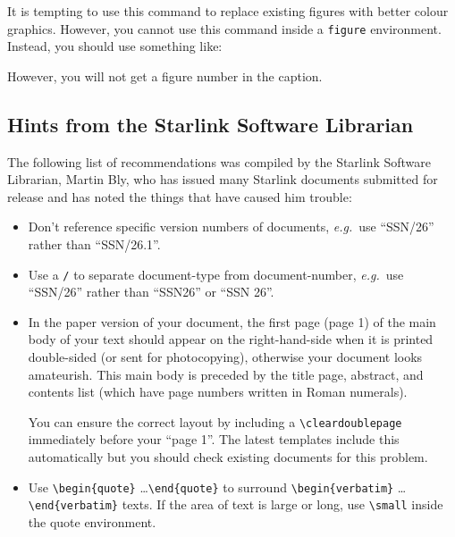\documentclass[twoside,11pt,nolof]{starlink}
\begin{document}
It is tempting to use this command to replace existing figures with better
colour graphics.
However, you cannot use this command inside a \texttt{figure} environment.
Instead, you should use something like:
\begin{quote}
\begin{terminalv}


\end{terminalv}
\end{quote}

However, you will not get a figure number in the caption.

\subsection{Hints from the Starlink Software Librarian}

The following list of recommendations was compiled by the Starlink Software
Librarian, Martin Bly, who has issued many Starlink documents submitted for
release and has noted the things that have caused him trouble:

\begin{itemize}

\item Don't reference specific version numbers of documents, \textit{e.g.}\ use
``SSN/26'' rather than ``SSN/26.1''.

\item Use a \verb+/+ to separate document-type from
document-number, \textit{e.g.}\ use ``SSN/26'' rather than ``SSN26'' or
``SSN 26''.

\item In the paper version of your document, the first page (page 1)
of the main body of your text should appear on the right-hand-side
when it is printed double-sided (or sent for photocopying), otherwise
your document looks amateurish.  This main body is preceded by the
title page, abstract, and contents list (which have page numbers
written in Roman numerals).

You can ensure the correct layout by including a \verb+\cleardoublepage+
immediately before your ``page 1''.
The latest templates include this automatically but you should check existing
documents for this problem.

\item Use \verb+\begin{quote}+ \ldots \verb+\end{quote}+ to surround
\verb+\+\verb+begin{verbatim}+ \ldots \verb+\+\verb+end{verbatim}+ texts.
If the area of text is large or long, use \verb+\small+ inside the quote
environment.

\end{itemize}
\end{document}
